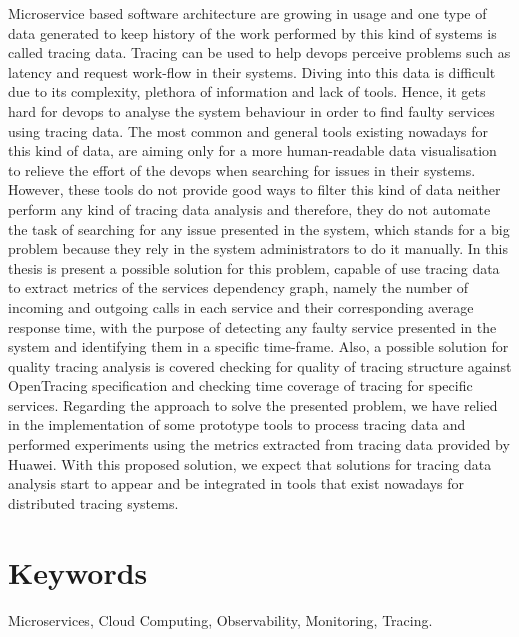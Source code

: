 Microservice based software architecture are growing in usage and one type of data generated to keep history of the work performed by this kind of systems is called tracing data. Tracing can be used to help \gls{devops} perceive problems such as latency and request work-flow in their systems.
Diving into this data is difficult due to its complexity, plethora of information and lack of tools. Hence, it gets hard for \gls{devops} to analyse the system behaviour in order to find faulty services using tracing data.
The most common and general tools existing nowadays for this kind of data, are aiming only for a more human-readable data visualisation to relieve the effort of the \gls{devops} when searching for issues in their systems. However, these tools do not provide good ways to filter this kind of data neither perform any kind of tracing data analysis and therefore, they do not automate the task of searching for any issue presented in the system, which stands for a big problem because they rely in the system administrators to do it manually.
In this thesis is present a possible solution for this problem, capable of use tracing data to extract metrics of the services dependency graph, namely the number of incoming and outgoing calls in each service and their corresponding average response time, with the purpose of detecting any faulty service presented in the system and identifying them in a specific time-frame. Also, a possible solution for quality tracing analysis is covered checking for quality of tracing structure against OpenTracing specification and checking time coverage of tracing for specific services.
Regarding the approach to solve the presented problem, we have relied in the implementation of some prototype tools to process tracing data and performed experiments using the metrics extracted from tracing data provided by Huawei.
With this proposed solution, we expect that solutions for tracing data analysis start to appear and be integrated in tools that exist nowadays for distributed tracing systems.

\section*{Keywords}
\label{sec:keywords}

Microservices, Cloud Computing, Observability, Monitoring, Tracing.

\restoregeometry